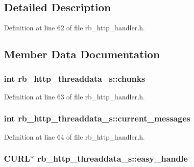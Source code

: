 \subsection{Detailed Description}


Definition at line 62 of file rb\+\_\+http\+\_\+handler.\+h.



\subsection{Member Data Documentation}
\hypertarget{structrb__http__threaddata__s_ac1c6fb826f5db3bbaca00a316cb06d58}{}
\subsubsection[{chunks}]{\setlength{\rightskip}{0pt plus 5cm}int rb\+\_\+http\+\_\+threaddata\+\_\+s\+::chunks}\label{structrb__http__threaddata__s_ac1c6fb826f5db3bbaca00a316cb06d58}


Definition at line 63 of file rb\+\_\+http\+\_\+handler.\+h.

\hypertarget{structrb__http__threaddata__s_a543467d6c1a80b4f1c4a8adfdc1dd4e6}{}
\subsubsection[{current\+\_\+messages}]{\setlength{\rightskip}{0pt plus 5cm}int rb\+\_\+http\+\_\+threaddata\+\_\+s\+::current\+\_\+messages}\label{structrb__http__threaddata__s_a543467d6c1a80b4f1c4a8adfdc1dd4e6}


Definition at line 64 of file rb\+\_\+http\+\_\+handler.\+h.

\hypertarget{structrb__http__threaddata__s_a6931a61d737ef95f2cc45d23ea8c9a67}{}
\subsubsection[{easy\+\_\+handle}]{\setlength{\rightskip}{0pt plus 5cm}C\+U\+R\+L$\ast$ rb\+\_\+http\+\_\+threaddata\+\_\+s\+::easy\+\_\+handle}\label{structrb__http__threaddata__s_a6931a61d737ef95f2cc45d23ea8c9a67}


